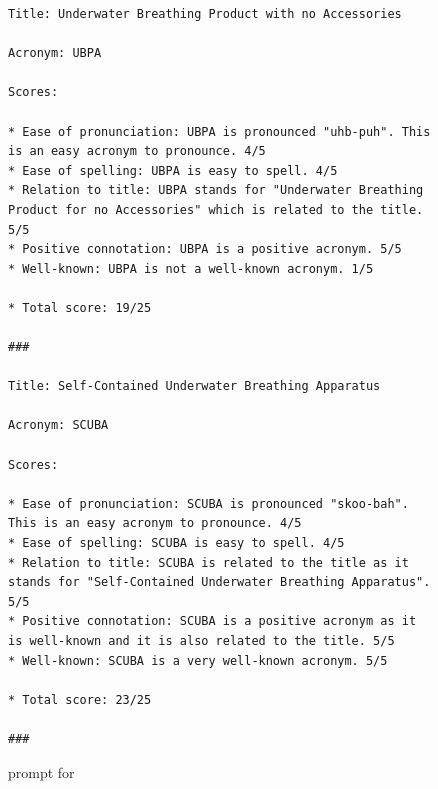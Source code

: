 \begin{figure}

\tiny
    \captionsetup{justification=centering, labelfont=bf, font=small}
    \begin{verbatim}
Title: Underwater Breathing Product with no Accessories

Acronym: UBPA

Scores:

* Ease of pronunciation: UBPA is pronounced "uhb-puh". This is an easy acronym to pronounce. 4/5
* Ease of spelling: UBPA is easy to spell. 4/5 
* Relation to title: UBPA stands for "Underwater Breathing Product for no Accessories" which is related to the title. 5/5
* Positive connotation: UBPA is a positive acronym. 5/5 
* Well-known: UBPA is not a well-known acronym. 1/5

* Total score: 19/25

###

Title: Self-Contained Underwater Breathing Apparatus

Acronym: SCUBA

Scores:

* Ease of pronunciation: SCUBA is pronounced "skoo-bah". This is an easy acronym to pronounce. 4/5 
* Ease of spelling: SCUBA is easy to spell. 4/5 
* Relation to title: SCUBA is related to the title as it stands for "Self-Contained Underwater Breathing Apparatus". 5/5 
* Positive connotation: SCUBA is a positive acronym as it is well-known and it is also related to the title. 5/5 
* Well-known: SCUBA is a very well-known acronym. 5/5

* Total score: 23/25

###

\end{verbatim}

\caption{\fbmod prompt for \acrogen}
    \label{fig:prompt:acronym:fb}
\end{figure}